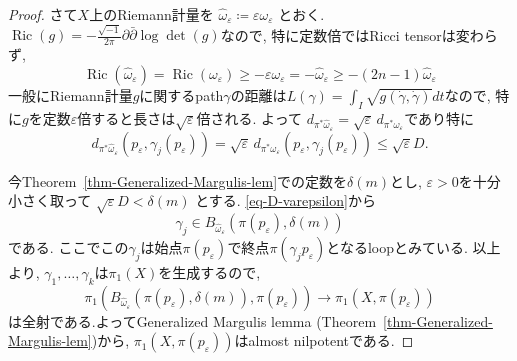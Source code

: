 \documentclass[dvipdfmx,a4paper,11pt]{article} %
\theoremstyle{definition}
\theoremstyle{remark}
\numberwithin{equation}{section}
\DeclareMathOperator{\Ric}{Ric}
\begin{document}
\begin{proof}
さて$X$上のRiemann計量を
\(
\widehat\omega_\varepsilon\coloneqq \varepsilon \omega_\varepsilon
\)
とおく. $\Ric(g)=-\frac{\sqrt{-1}}{2\pi}\partial \bar\partial\log \det(g)$なので, 特に定数倍ではRicci tensorは変わらず, 
\[
\Ric(\widehat\omega_\varepsilon)=\Ric(\omega_\varepsilon)\geq-\varepsilon \omega_\varepsilon=-\widehat\omega_\varepsilon
\geq -(2n-1)\widehat\omega_\varepsilon
\]
一般にRiemann計量$g$に関するpath$\gamma$の距離は$L(\gamma)=\int_{I}\sqrt{g(\dot{\gamma}, \dot{\gamma})}dt$なので, 特に$g$を定数$\varepsilon$倍すると長さは$\sqrt{\varepsilon}$倍される. 
よって
\(
d_{\pi^{*}\widehat\omega_\varepsilon}=\sqrt{\varepsilon}\,d_{\pi^{*}\omega_\varepsilon}\)であり特に
\begin{equation}
\label{eq-D-varepsilon}
d_{\pi^{*}\widehat\omega_\varepsilon}(p_\varepsilon,\gamma_j(p_\varepsilon))
=\sqrt{\varepsilon}\,d_{\pi^{*}\omega_\varepsilon}(p_\varepsilon,\gamma_j(p_\varepsilon))
\leq\sqrt{\varepsilon}D.
\end{equation}

今Theorem~\ref{thm-Generalized-Margulis-lem}での定数を$\delta(m)$とし, 
$\varepsilon>0$を十分小さく取って
\(
\sqrt{\varepsilon}D<\delta(m)
\)
とする. 
\eqref{eq-D-varepsilon}から
\[
\gamma_j \in B_{\widehat\omega_\varepsilon}(\pi(p_\varepsilon),\delta(m))
\]
である. ここでこの$\gamma_j $は始点$\pi(p_\varepsilon)$で終点$\pi(\gamma_j p_\varepsilon)$となるloopとみている. 
以上より,  $\gamma_1,\ldots,\gamma_k$は$\pi_1(X)$を生成するので,
\[
\pi_1(B_{\widehat\omega_\varepsilon}(\pi(p_\varepsilon),\delta(m)),\pi(p_\varepsilon))\longrightarrow\pi_1(X,\pi(p_\varepsilon))
\]
は全射である.よってGeneralized Margulis lemma (Theorem~\ref{thm-Generalized-Margulis-lem})から, $\pi_1(X,\pi(p_\varepsilon))$はalmost nilpotentである.
\end{proof}
\end{document}
